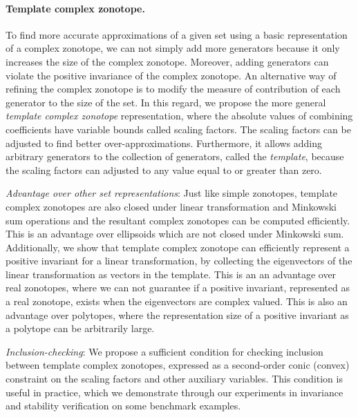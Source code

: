 \documentclass[11pt,a4paper,twoside,openright]{article}
\begin{document}
\paragraph{Template complex zonotope.}  To find more accurate approximations
of a given set using a basic representation of a complex zonotope, we
can not simply add more generators because it only increases the size
of the complex zonotope.  Moreover, adding generators can violate the
positive invariance of the complex zonotope.  An alternative way of
refining the complex zonotope is to modify the measure of contribution
of each generator to the size of the set.  In this regard, we propose
the more general {\it template complex zonotope} representation, where
the absolute values of combining coefficients have variable bounds
called scaling factors.  The scaling factors can be adjusted to find
better over-approximations.  Furthermore, it allows adding arbitrary
generators to the collection of generators, called the {\it template},
because the scaling factors can adjusted to any value equal to or
greater than zero.

{\it Advantage over other set representations}: Just like simple
zonotopes, template complex zonotopes are also closed under linear
transformation and Minkowski sum operations and the resultant complex
zonotopes can be computed efficiently.  This is an advantage over
ellipsoids which are not closed under Minkowski sum.  Additionally, we
show that template complex zonotope can efficiently represent a
positive invariant for a linear transformation, by collecting the
eigenvectors of the linear transformation as vectors in the template.
This is an an advantage over real zonotopes, where we can not
guarantee if a positive invariant, represented as a real zonotope,
exists when the eigenvectors are complex valued.  This is also an
advantage over polytopes, where the representation size of a positive
invariant as a polytope can be arbitrarily large.

{\it Inclusion-checking}: We propose a sufficient condition for
checking inclusion between template complex zonotopes, expressed as a
second-order conic (convex) constraint on the scaling factors
and other auxiliary variables.  This condition is useful in practice,
which we demonstrate through our experiments in invariance and stability
verification on some benchmark examples.
\end{document}
